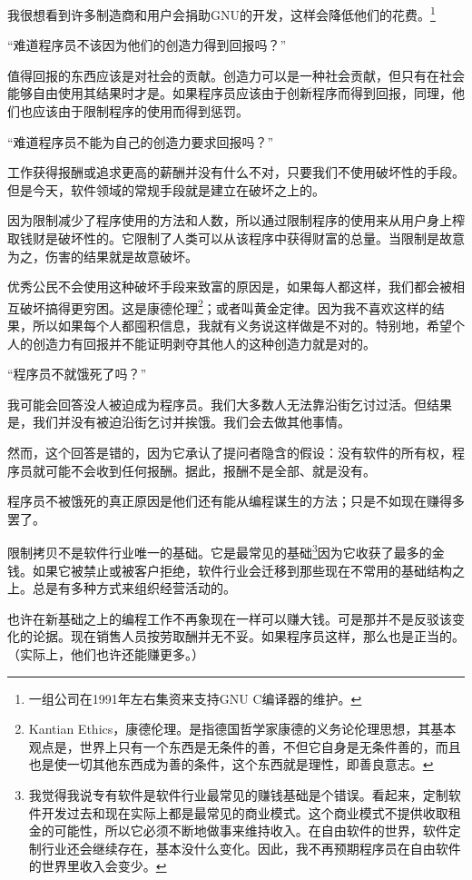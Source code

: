 我很想看到许多制造商和用户会捐助GNU的开发，这样会降低他们的花费。\footnote{一组公司在1991年左右集资来支持GNU C编译器的维护。}\par
“难道程序员不该因为他们的创造力得到回报吗？”\par
值得回报的东西应该是对社会的贡献。创造力可以是一种社会贡献，但只有在社会能够自由使用其结果时才是。如果程序员应该由于创新程序而得到回报，同理，他们也应该由于限制程序的使用而得到惩罚。\par
“难道程序员不能为自己的创造力要求回报吗？”\par
工作获得报酬或追求更高的薪酬并没有什么不对，只要我们不使用破坏性的手段。但是今天，软件领域的常规手段就是建立在破坏之上的。\par
因为限制减少了程序使用的方法和人数，所以通过限制程序的使用来从用户身上榨取钱财是破坏性的。它限制了人类可以从该程序中获得财富的总量。当限制是故意为之，伤害的结果就是故意破坏。\par
优秀公民不会使用这种破坏手段来致富的原因是，如果每人都这样，我们都会被相互破坏搞得更穷困。这是康德伦理\footnote{Kantian Ethics，康德伦理。是指德国哲学家康德的义务论伦理思想，其基本观点是，世界上只有一个东西是无条件的善，不但它自身是无条件善的，而且也是使一切其他东西成为善的条件，这个东西就是理性，即善良意志。}；或者叫黄金定律。因为我不喜欢这样的结果，所以如果每个人都囤积信息，我就有义务说这样做是不对的。特别地，希望个人的创造力有回报并不能证明剥夺其他人的这种创造力就是对的。\par
“程序员不就饿死了吗？”\par
我可能会回答没人被迫成为程序员。我们大多数人无法靠沿街乞讨过活。但结果是，我们并没有被迫沿街乞讨并挨饿。我们会去做其他事情。\par
然而，这个回答是错的，因为它承认了提问者隐含的假设：没有软件的所有权，程序员就可能不会收到任何报酬。据此，报酬不是全部、就是没有。\par
程序员不被饿死的真正原因是他们还有能从编程谋生的方法；只是不如现在赚得多罢了。\par
限制拷贝不是软件行业唯一的基础。它是最常见的基础\footnote{我觉得我说专有软件是软件行业最常见的赚钱基础是个错误。看起来，定制软件开发过去和现在实际上都是最常见的商业模式。这个商业模式不提供收取租金的可能性，所以它必须不断地做事来维持收入。在自由软件的世界，软件定制行业还会继续存在，基本没什么变化。因此，我不再预期程序员在自由软件的世界里收入会变少。}因为它收获了最多的金钱。如果它被禁止或被客户拒绝，软件行业会迁移到那些现在不常用的基础结构之上。总是有多种方式来组织经营活动的。\par
也许在新基础之上的编程工作不再象现在一样可以赚大钱。可是那并不是反驳该变化的论据。现在销售人员按劳取酬并无不妥。如果程序员这样，那么也是正当的。（实际上，他们也许还能赚更多。）\par
